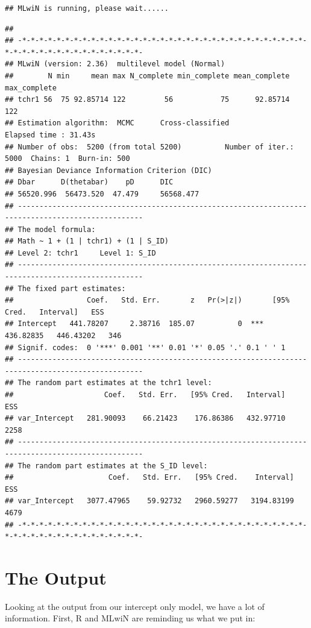 \documentclass[
]{book}
\begin{document}
\begin{verbatim}
## MLwiN is running, please wait......
\end{verbatim}

\begin{verbatim}
## 
## -*-*-*-*-*-*-*-*-*-*-*-*-*-*-*-*-*-*-*-*-*-*-*-*-*-*-*-*-*-*-*-*-*-*-*-*-*-*-*-*-*-*-*-*-*-*-*-*-*- 
## MLwiN (version: 2.36)  multilevel model (Normal) 
##        N min     mean max N_complete min_complete mean_complete max_complete
## tchr1 56  75 92.85714 122         56           75      92.85714          122
## Estimation algorithm:  MCMC      Cross-classified              Elapsed time : 31.43s 
## Number of obs:  5200 (from total 5200)          Number of iter.: 5000  Chains: 1  Burn-in: 500 
## Bayesian Deviance Information Criterion (DIC)
## Dbar      D(thetabar)    pD      DIC
## 56520.996  56473.520  47.479     56568.477  
## --------------------------------------------------------------------------------------------------- 
## The model formula:
## Math ~ 1 + (1 | tchr1) + (1 | S_ID)
## Level 2: tchr1     Level 1: S_ID      
## --------------------------------------------------------------------------------------------------- 
## The fixed part estimates:  
##                 Coef.   Std. Err.       z   Pr(>|z|)       [95% Cred.   Interval]   ESS 
## Intercept   441.78207     2.38716  185.07          0  ***   436.82835   446.43202   346 
## Signif. codes:  0 '***' 0.001 '**' 0.01 '*' 0.05 '.' 0.1 ' ' 1  
## --------------------------------------------------------------------------------------------------- 
## The random part estimates at the tchr1 level: 
##                     Coef.   Std. Err.   [95% Cred.   Interval]    ESS 
## var_Intercept   281.90093    66.21423    176.86386   432.97710   2258 
## --------------------------------------------------------------------------------------------------- 
## The random part estimates at the S_ID level: 
##                      Coef.   Std. Err.   [95% Cred.    Interval]    ESS 
## var_Intercept   3077.47965    59.92732   2960.59277   3194.83199   4679 
## -*-*-*-*-*-*-*-*-*-*-*-*-*-*-*-*-*-*-*-*-*-*-*-*-*-*-*-*-*-*-*-*-*-*-*-*-*-*-*-*-*-*-*-*-*-*-*-*-*-
\end{verbatim}

\hypertarget{the-output}{%
\section{The Output}\label{the-output}}

Looking at the output from our intercept only model, we have a lot of information. First, R and MLwiN are reminding us what we put in:
\end{document}
